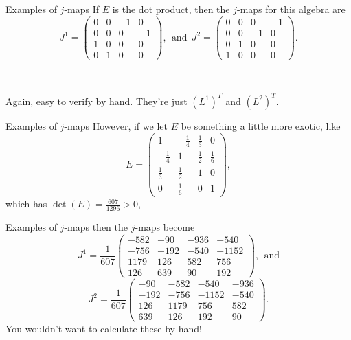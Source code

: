 \documentclass{beamer}
\begin{document}
\begin{frame}{Examples of $j$-maps}
If $E$ is the dot product, then the $j$-maps for this algebra are 
$$
J^1 = \begin{pmatrix}
0 & 0 & -1 & 0 \\
0 & 0 & 0 & -1 \\
1 & 0 & 0 & 0 \\
0 & 1 & 0 & 0
\end{pmatrix},\ \ \text{and}\ \ J^2 = \begin{pmatrix}
0 & 0 & 0 & -1 \\
0 & 0 & -1 & 0 \\
0 & 1 & 0 & 0 \\
1 & 0 & 0 & 0 
\end{pmatrix}.
$$

\

\pause
Again, easy to verify by hand. They're just $(L^1)^T$ and $(L^2)^T$.
\end{frame}

\begin{frame}{Examples of $j$-maps}
However, if we let $E$ be something a little more exotic, like
$$
E = \begin{pmatrix} 
1 & -\frac{1}{4} & \frac{1}{3} & 0 \\[0.5 ex]
-\frac{1}{4} & 1 & \frac{1}{2} & \frac{1}{6} \\[0.5 ex]
\frac{1}{3} & \frac{1}{2} & 1 & 0 \\[0.5 ex]
0 & \frac{1}{6} & 0 & 1
\end{pmatrix},
$$
which has $\det(E) = \frac{607}{1296} > 0$, 
\end{frame}

\begin{frame}{Examples of $j$-maps}
then the $j$-maps become
$$
J^1 = \frac{1}{607}\begin{pmatrix}
-582 & -90 & -936 & -540 \\
-756 & -192 & -540 & -1152 \\
1179 & 126 & 582 & 756 \\
126 & 639 & 90 & 192
\end{pmatrix}, \ \ \text{and}
$$
$$
J^2 = \frac{1}{607} \begin{pmatrix}
-90 & -582 & -540 & -936 \\
-192 & -756 & -1152 & -540 \\
126 & 1179 & 756 & 582 \\
639 & 126 & 192 & 90
\end{pmatrix}.
$$
\pause
You wouldn't want to calculate these by hand!
\end{frame}
\end{document}

